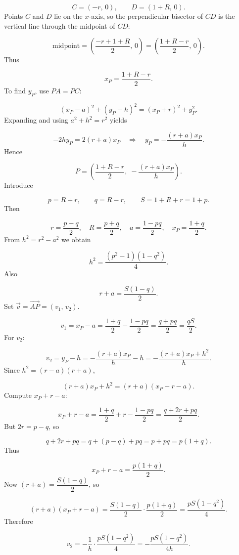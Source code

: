 \[
C = (-r,\, 0),\qquad D = (1+R,\, 0).
\]
Points \(C\) and \(D\) lie on the \(x\)-axis, so the perpendicular bisector of \(CD\) is the vertical line through the midpoint of \(CD\):\par
\[
\text{midpoint} = \left(\frac{-r + 1+R}{2},\,0\right) = \left(\frac{1+R-r}{2},\,0\right).
\]
Thus\par
\[
x_P = \frac{1+R-r}{2}.
\]
To find \(y_P\), use \(PA = PC\):\par
\[
(x_P - a)^2 + (y_P - h)^2 = (x_P + r)^2 + y_P^2.
\]
Expanding and using \(a^2+h^2 = r^2\) yields\par
\[
-2h y_P = 2(r+a)x_P \quad\Longrightarrow\quad y_P = -\frac{(r+a)x_P}{h}.
\]
Hence\par
\[
P = \left(\frac{1+R-r}{2},\; -\frac{(r+a)x_P}{h}\right).
\]
Introduce\par
\[
p = R + r,\qquad q = R - r,\qquad S = 1 + R + r = 1 + p.
\]
Then\par
\[
r = \frac{p - q}{2},\quad R = \frac{p + q}{2},\quad a = \frac{1 - p q}{2},\quad x_P = \frac{1 + q}{2}.
\]
From \(h^2 = r^2 - a^2\) we obtain\par
\[
h^2 = \frac{(p^2-1)(1-q^2)}{4}.
\]
Also\par
\[
r + a = \frac{S(1 - q)}{2}.
\]
Set \(\vec{v} = \overrightarrow{AP} = (v_1,\, v_2)\).\par
\[
v_1 = x_P - a = \frac{1+q}{2} - \frac{1 - p q}{2} = \frac{q + p q}{2} = \frac{q S}{2}.
\]
For \(v_2\):\par
\[
v_2 = y_P - h = -\frac{(r+a)x_P}{h} - h = -\frac{(r+a)x_P + h^2}{h}.
\]
Since \(h^2 = (r-a)(r+a)\),\par
\[
(r+a)x_P + h^2 = (r+a)(x_P + r - a).
\]
Compute \(x_P + r - a\):\par
\[
x_P + r - a = \frac{1+q}{2} + r - \frac{1 - p q}{2} = \frac{q + 2r + p q}{2}.
\]
But \(2r = p - q\), so\par
\[
q + 2r + p q = q + (p - q) + p q = p + p q = p(1 + q).
\]
Thus\par
\[
x_P + r - a = \frac{p(1+q)}{2}.
\]
Now \((r+a) = \dfrac{S(1-q)}{2}\), so\par
\[
(r+a)(x_P + r - a) = \frac{S(1-q)}{2} \cdot \frac{p(1+q)}{2} = \frac{p S (1 - q^2)}{4}.
\]
Therefore\par
\[
v_2 = -\frac{1}{h}\cdot\frac{p S (1 - q^2)}{4} = -\frac{p S (1 - q^2)}{4h}.
\]
